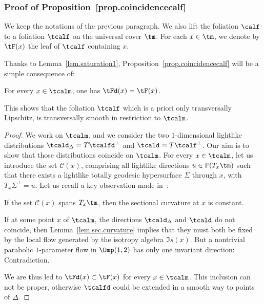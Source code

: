 \subsubsection{Proof of Proposition~\ref{prop.coincidencecalf}}

We keep the notations of the previous paragraph. We also lift the foliation $\calf$ to a foliation $\tcalf$ on the universal cover $\tm$. For each $x \in \tm$, we denote by $\tF(x)$ the leaf of $\tcalf$ containing $x$.

Thanks to Lemma~\ref{lem.saturation1}, Proposition~\ref{prop.coincidencecalf} will be a simple consequence of:

\begin{lemm}\label{lem.saturation2}
For every $x \in \tcalm$, one has $\tFd(x)= \tF(x)$.
\end{lemm}

This shows that the foliation $\tcalf$ which is a priori only transversally Lipschitz, is transversally smooth in restriction to $\tcalm$.


\begin{proof}
We work on $\tcalm$, and we consider the two $1$-dimensional lightlike distributions $\tcald_{\Delta}=T\tcalfd^{\perp}$ and $\tcald=T\tcalf^{\perp}$. Our aim is to show that those distributions coincide on $\tcalm$. For every $x \in \tcalm$, let us introduce the set ${\mathcal C}(x)$, comprising all lightlike directions $u \in {\mathbb P}(T_x\tm)$ such that there exists a lightlike totally geodesic hypersurface $\Sigma$ through $x$, with $T_x\Sigma^{\perp}=u$. Let us recall a key observation made in~\cite{zeghibisom2}:

\begin{lemm}\label{lem.sec.curvature}
If the set ${\mathcal C}(x)$ spans $T_x\tm$, then the sectional curvature at $x$ is constant.
\end{lemm}

If at some point $x$ of $\tcalm$, the directions $\tcald_{\Delta}$ and $\tcald$ do not coincide, then Lemma~\ref{lem.sec.curvature} implies that they must both be fixed by the local flow generated by the isotropy algebra ${\mathfrak Is}(x)$. But a nontrivial parabolic $1$-parameter flow in $\Omp(1,2)$ has only one invariant direction: Contradiction.


We are thus led to $\tFd(x) \subset \tF(x)$ for every $x \in \tcalm$. This inclusion can not be proper, otherwise $\tcalfd$ could be extended in a smooth way to points of $\tilde{\Delta}$.
\end{proof}



